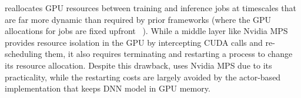 \name reallocates GPU resources between training and inference jobs at timescales that are far more dynamic than required by prior frameworks (where the GPU allocations for jobs are fixed upfront ~\cite{kubernetes, yarn}).  
While a middle layer like Nvidia MPS~\cite{nvidia-mps} provides resource isolation in the GPU by intercepting CUDA calls and re-scheduling them, it also 
requires terminating and restarting a process to change its resource allocation. %
Despite this drawback, \name uses Nvidia MPS due to its practicality, while the restarting costs are largely avoided by the actor-based implementation that keeps DNN model in GPU memory. %




